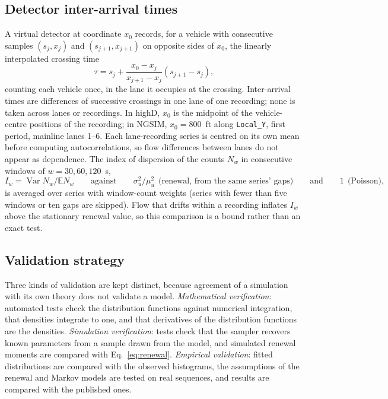 \documentclass[10pt,a4paper]{article}
\numberwithin{equation}{section}
\newcommand{\E}{\mathbb{E}}
\newcommand{\Var}{\operatorname{Var}}
\begin{document}
\subsection{Detector inter-arrival times}\label{sec:detmethod}
A virtual detector at coordinate $x_0$ records, for a vehicle with consecutive samples $(s_j,x_j)$ and $(s_{j+1},x_{j+1})$ on opposite sides of $x_0$, the linearly interpolated crossing time
\begin{equation}\label{eq:crossing}
\tau=s_j+\frac{x_0-x_j}{x_{j+1}-x_j}(s_{j+1}-s_j),
\end{equation}
counting each vehicle once, in the lane it occupies at the crossing. Inter-arrival times are differences of successive crossings in one lane of one recording; none is taken across lanes or recordings. In highD, $x_0$ is the midpoint of the vehicle-centre positions of the recording; in NGSIM, $x_0=800$~ft along \texttt{Local\_Y}, first period, mainline lanes 1--6.
Each lane-recording series is centred on its own mean before computing autocorrelations, so flow differences between lanes do not appear as dependence. The index of dispersion of the counts $N_w$ in consecutive windows of $w=30,60,120$~s,
\begin{equation}\label{eq:window}
I_w=\Var N_w/\E N_w\qquad\text{against}\qquad \sigma_u^2/\mu_u^2\ \ \text{(renewal, from the same series' gaps)}\qquad\text{and}\qquad 1\ \ \text{(Poisson)},
\end{equation}
is averaged over series with window-count weights (series with fewer than five windows or ten gaps are skipped). Flow that drifts within a recording inflates $I_w$ above the stationary renewal value, so this comparison is a bound rather than an exact test.

\subsection{Validation strategy}\label{sec:valstrat}
Three kinds of validation are kept distinct, because agreement of a simulation with its own theory does not validate a model. \emph{Mathematical verification}: automated tests check the distribution functions against numerical integration, that densities integrate to one, and that derivatives of the distribution functions are the densities.
\emph{Simulation verification}: tests check that the sampler recovers known parameters from a sample drawn from the model, and simulated renewal moments are compared with Eq.~\eqref{eq:renewal}. \emph{Empirical validation}: fitted distributions are compared with the observed histograms, the assumptions of the renewal and Markov models are tested on real sequences, and results are compared with the published ones.
\end{document}
